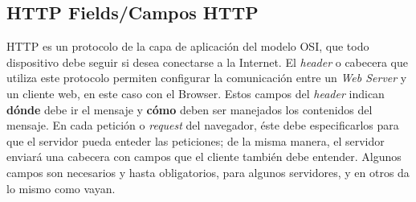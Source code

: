 \subsection{HTTP Fields/Campos HTTP}
    \label{chap2:headers}
    HTTP es un protocolo de la capa de aplicación del modelo OSI, que todo dispositivo debe seguir si desea conectarse a la Internet. El \textit{header} o cabecera que utiliza este protocolo permiten configurar la comunicación entre un \textit{Web Server} y un cliente web, en este caso con el Browser. Estos campos del \textit{header} indican \textbf{dónde} debe ir el mensaje y \textbf{cómo} deben ser manejados los contenidos del mensaje. En cada petición o \textit{request} del navegador, éste debe especificarlos para que el servidor pueda enteder las peticiones; de la misma manera, el servidor enviará una cabecera con campos que el cliente también debe entender. Algunos campos son necesarios y hasta obligatorios, para algunos servidores, y en otros da lo mismo como vayan.

